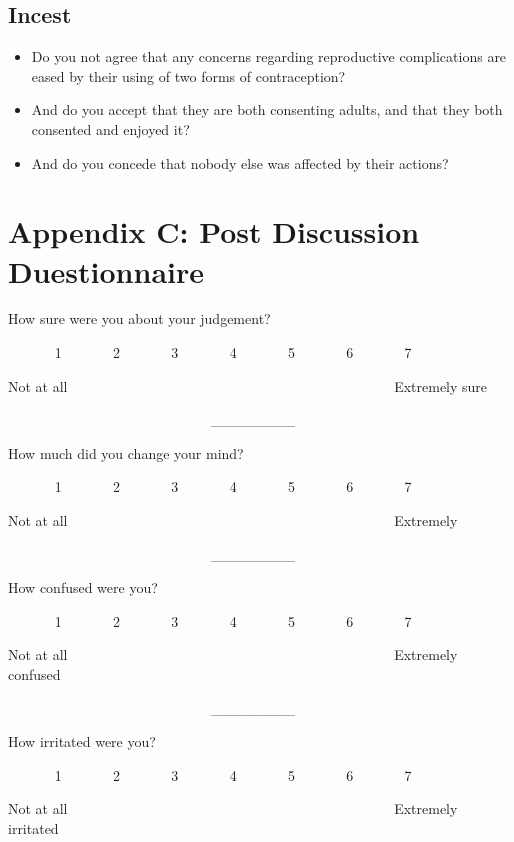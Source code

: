 \subsection{Incest}\label{incest-1}

\begin{itemize}
\tightlist
\item
  Do you not agree that any concerns regarding reproductive
  complications are eased by their using of two forms of contraception?
\item
  And do you accept that they are both consenting adults, and that they
  both consented and enjoyed it?
\item
  And do you concede that nobody else was affected by their actions?
\end{itemize}

\newpage

\section{Appendix C: Post Discussion
Duestionnaire}\label{appendix-c-post-discussion-duestionnaire}

How sure were you about your judgement?

~~~~~~ 1 ~~~~~~ 2 ~~~~~~ 3 ~~~~~~ 4 ~~~~~~ 5 ~~~~~~ 6 ~~~~~~ 7

Not at all ~~~~~~~~~~~~~~~~~~~~~~~~~~~~~~~~~~~~~~~~~~~~~~Extremely sure

~~~~~~~~~~~~~~~~~~~~~~~~~~~~~\_\_\_\_\_\_\_\_

How much did you change your mind?

~~~~~~ 1 ~~~~~~ 2 ~~~~~~ 3 ~~~~~~ 4 ~~~~~~ 5 ~~~~~~ 6 ~~~~~~ 7

Not at all ~~~~~~~~~~~~~~~~~~~~~~~~~~~~~~~~~~~~~~~~~~~~~~Extremely

~~~~~~~~~~~~~~~~~~~~~~~~~~~~~\_\_\_\_\_\_\_\_

How confused were you?

~~~~~~ 1 ~~~~~~ 2 ~~~~~~ 3 ~~~~~~ 4 ~~~~~~ 5 ~~~~~~ 6 ~~~~~~ 7

Not at all ~~~~~~~~~~~~~~~~~~~~~~~~~~~~~~~~~~~~~~~~~~~~~~Extremely
confused

~~~~~~~~~~~~~~~~~~~~~~~~~~~~~\_\_\_\_\_\_\_\_

How irritated were you?

~~~~~~ 1 ~~~~~~ 2 ~~~~~~ 3 ~~~~~~ 4 ~~~~~~ 5 ~~~~~~ 6 ~~~~~~ 7

Not at all ~~~~~~~~~~~~~~~~~~~~~~~~~~~~~~~~~~~~~~~~~~~~~~Extremely
irritated

